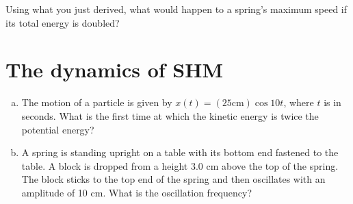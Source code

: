 \documentclass[12pt]{article}
\begin{document}
Using what you just derived, what would happen to a spring's maximum speed if its total energy is doubled? 


\section{The dynamics of SHM}
\begin{enumerate}[(a)]
	\item The motion of a particle is given by $x(t) = (25 \text{cm})\cos{10t}$, where $t$ is in seconds. What is the first time at which the kinetic energy is twice the potential energy? 
	\vspace{60mm}
	\item A spring is standing upright on a table with its bottom end fastened to the table. A block is dropped from a height 3.0 cm above the top of the spring. The block sticks to the top end of the spring and then oscillates with an amplitude of 10 cm. What is the oscillation frequency?
\end{enumerate}
\end{document}
